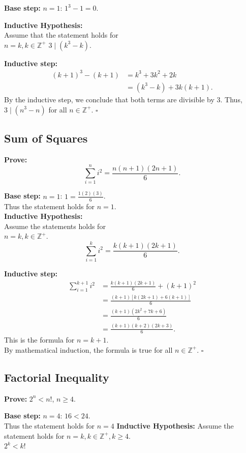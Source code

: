 \textbf{Base step:} $n=1$: $1^3-1=0$.

\textbf{Inductive Hypothesis:} \\ 
Assume that the statement holds for \\
$n = k,k\in\mathbb{Z}^{+}$
$3\mid(k^3-k)$.

\textbf{Inductive step:}
\[
\begin{aligned}
(k+1)^3-(k+1)
&=k^3+3k^2+2k\\
&=(k^3-k)+3k(k+1).
\end{aligned}
\]
By the inductive step, we conclude that
both terms are divisible by 3.
Thus, $3\mid(n^3-n)$ for all $n\in\mathbb{Z}^{+}$.
$\square$

\subsection{Sum of Squares}
\textbf{Prove:}
\[
\sum_{i=1}^{n}i^2
=\frac{n(n+1)(2n+1)}{6}.
\]

\textbf{Base step:} $n=1$:
$1=\frac{1(2)(3)}{6}$.\\
Thus the statement holds for $n=1$.\\
\textbf{Inductive Hypothesis:} \\ 
Assume the statements holds for \\ $n=k,k\in\mathbb{Z}^{+}$.
\[
\sum_{i=1}^{k}i^2
=\frac{k(k+1)(2k+1)}{6}.
\]

\textbf{Inductive step:}
\[
\begin{aligned}
\sum_{i=1}^{k+1}i^2
&=\frac{k(k+1)(2k+1)}{6}+(k+1)^2\\
&=\frac{(k+1)[k(2k+1)+6(k+1)]}{6}\\
&=\frac{(k+1)(2k^2+7k+6)}{6}\\
&=\frac{(k+1)(k+2)(2k+3)}{6}.
\end{aligned}
\]
This is the formula for $n=k+1$.\\
By mathematical induction, the formula is true for all $n\in\mathbb{Z}^{+}$. $\square$

\subsection{Factorial Inequality}
\textbf{Prove:} $2^n<n!$, $n\geq4$.

\textbf{Base step:} $n=4$: $16<24$.\\
Thus the statement holds for $n=4$
\textbf{Inductive Hypothesis:} 
Assume the statement holds for $n=k,k\in\mathbb{Z}^{+},k\geq4$. \\
$2^k<k!$

